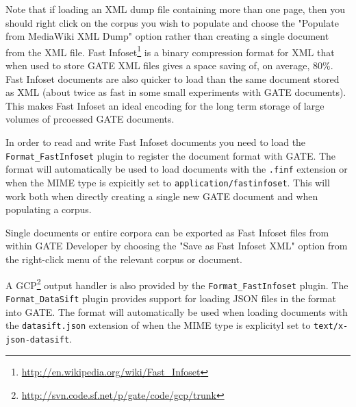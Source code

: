 Note that if loading an XML dump file containing more than one page, then you
should right click on the corpus you wish to populate and choose the "Populate
from MediaWiki XML Dump" option rather than creating a single document from the
XML file.
%
%
Fast Infoset\footnote{\url{http://en.wikipedia.org/wiki/Fast_Infoset}} is a
binary compression format for XML that when used to store GATE XML files
gives a space saving of, on average, 80\%. Fast Infoset documents are also
quicker to load than the same document stored as XML (about twice as fast
in some small experiments with GATE documents). This makes Fast Infoset an
ideal encoding for the long term storage of large volumes of prcoessed GATE
documents.

In order to read and write Fast Infoset documents you need to load the
\verb!Format_FastInfoset! plugin to register the document format with GATE.
The format will automatically be used to load documents with the \verb!.finf!
extension or when the MIME type is expicitly set to
\verb!application/fastinfoset!. This will work both when directly creating a
single new GATE document and when populating a corpus.

Single documents or entire corpora can be exported as Fast Infoset files from
within GATE Developer by choosing the "Save as Fast Infoset XML" option from
the right-click menu of the relevant corpus or document.

A GCP\footnote{\url{http://svn.code.sf.net/p/gate/code/gcp/trunk}} output
handler is also provided by the \verb!Format_FastInfoset! plugin.
%
%
The \verb!Format_DataSift! plugin provides support for loading JSON files in the
 format into GATE. The format will
automatically be used when loading documents with the \verb!datasift.json!
extension of when the MIME type is explicityl set to \verb!text/x-json-datasift!.

